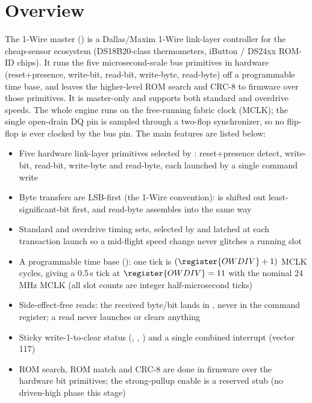 \section{Overview}

The 1-Wire master () is a Dallas/Maxim 1-Wire link-layer controller for the cheap-sensor ecosystem (DS18B20-class thermometers, iButton / DS24xx ROM-ID chips). It runs the five microsecond-scale bus primitives in hardware (reset+presence, write-bit, read-bit, write-byte, read-byte) off a programmable time base, and leaves the higher-level ROM search and CRC-8 to firmware over those primitives. It is master-only and supports both standard and overdrive speeds. The whole engine runs on the free-running fabric clock (MCLK); the single open-drain DQ pin is sampled through a two-flop synchronizer, so no flip-flop is ever clocked by the bus pin. The main features are listed below:

\begin{itemize}
	\item Five hardware link-layer primitives selected by : reset+presence detect, write-bit, read-bit, write-byte and read-byte, each launched by a single command write
	\item Byte transfers are LSB-first (the 1-Wire convention):  is shifted out least-significant-bit first, and read-byte assembles into  the same way
	\item Standard and overdrive timing sets, selected by  and latched at each transaction launch so a mid-flight speed change never glitches a running slot
	\item A programmable time base (): one tick is $(\register{OWDIV}+1)$ MCLK cycles, giving a 0.5\,\textmu s tick at $\register{OWDIV}=11$ with the nominal 24\,MHz MCLK (all slot counts are integer half-microsecond ticks)
	\item Side-effect-free reads: the received byte/bit lands in , never in the command register; a read never launches or clears anything
	\item Sticky write-1-to-clear status (, , ) and a single combined interrupt (vector 117)
	\item ROM search, ROM match and CRC-8 are done in firmware over the hardware bit primitives; the strong-pullup enable is a reserved stub (no driven-high phase this stage)
\end{itemize}

